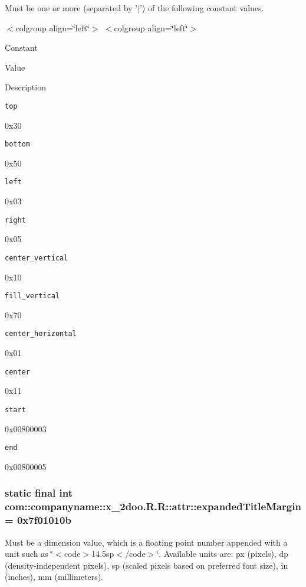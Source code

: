 Must be one or more (separated by '$|$') of the following constant values. \begin{TabularC}{0}
\hline
\end{TabularC}
$<$colgroup align=\char`\"{}left\char`\"{}$>$ $<$colgroup align=\char`\"{}left\char`\"{}$>$ 

Constant

Value

Description 

{\tt top}

0x30

{\tt bottom}

0x50

{\tt left}

0x03

{\tt right}

0x05

{\tt center\_\-vertical}

0x10

{\tt fill\_\-vertical}

0x70

{\tt center\_\-horizontal}

0x01

{\tt center}

0x11

{\tt start}

0x00800003

{\tt end}

0x00800005\hypertarget{classcom_1_1companyname_1_1x__2doo_1_1_r_1_1attr_f8591111e92d0636a1acdd1a8ad52c26}{
\subsubsection[{expandedTitleMargin}]{\setlength{\rightskip}{0pt plus 5cm}static final int com::companyname::x\_\-2doo.R.R::attr::expandedTitleMargin = 0x7f01010b}}
\label{classcom_1_1companyname_1_1x__2doo_1_1_r_1_1attr_f8591111e92d0636a1acdd1a8ad52c26}


Must be a dimension value, which is a floating point number appended with a unit such as \char`\"{}$<$code$>$14.5sp$<$/code$>$\char`\"{}. Available units are: px (pixels), dp (density-independent pixels), sp (scaled pixels based on preferred font size), in (inches), mm (millimeters). 


